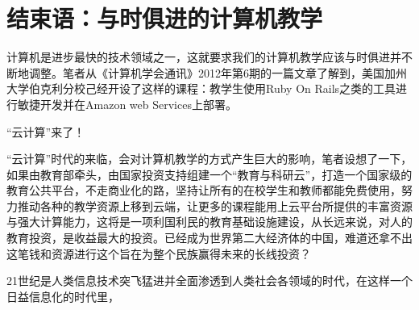 \section{结束语：与时俱进的计算机教学}

计算机是进步最快的技术领域之一，这就要求我们的计算机教学应该与时俱进并不断地调整。笔者从《计算机学会通讯》2012年第6期的一篇文章了解到，美国加州大学伯克利分校己经开设了这样的课程：教学生使用Ruby On Rails之类的工具进行敏捷开发并在Amazon web Services上部署。

“云计算”来了！

 “云计算”时代的来临，会对计算机教学的方式产生巨大的影响，笔者设想了一下，如果由教育部牵头，由国家投资支持组建一个“教育与科研云”，打造一个国家级的教育公共平台，不走商业化的路，坚持让所有的在校学生和教师都能免费使用，努力推动各种的教学资源上移到云端，让更多的课程能用上云平台所提供的丰富资源与强大计算能力，这将是一项利国利民的教育基础设施建设，从长远来说，对人的教育投资，是收益最大的投资。已经成为世界第二大经济体的中国，难道还拿不出这笔钱和资源进行这个旨在为整个民族赢得未来的长线投资？

21世纪是人类信息技术突飞猛进并全面渗透到人类社会各领域的时代，在这样一个日益信息化的时代里，



\clearpage







